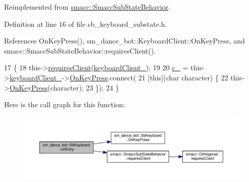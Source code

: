 Reimplemented from \hyperlink{classsmacc_1_1SmaccSubStateBehavior_a47eb8983afa8e1d312873a9a297b84f3}{smacc\+::\+Smacc\+Sub\+State\+Behavior}.



Definition at line 16 of file sb\+\_\+keyboard\+\_\+substate.\+h.



References On\+Key\+Press(), sm\+\_\+dance\+\_\+bot\+::\+Keyboard\+Client\+::\+On\+Key\+Press, and smacc\+::\+Smacc\+Sub\+State\+Behavior\+::requires\+Client().


\begin{DoxyCode}
17         \{
18                 this->\hyperlink{classsmacc_1_1SmaccSubStateBehavior_ae8361a9e794b02f9f3d962b881e4fd7d}{requiresClient}(\hyperlink{classsm__dance__bot_1_1SbKeyboard_a97e5f96ff468cf7a09b46027aba5ff3d}{keyboardClient\_});
19 
20                 \hyperlink{classsm__dance__bot_1_1SbKeyboard_a9dc9a84d7fdb70453fd98e9bb49e9e21}{c\_} = this->\hyperlink{classsm__dance__bot_1_1SbKeyboard_a97e5f96ff468cf7a09b46027aba5ff3d}{keyboardClient\_}->\hyperlink{classsm__dance__bot_1_1KeyboardClient_aeaf2f85801120bd76adfd6455650dc03}{OnKeyPress}.connect(
21                     [\textcolor{keyword}{this}](\textcolor{keywordtype}{char} character) \{
22                             this->\hyperlink{classsm__dance__bot_1_1SbKeyboard_a814aeec77233d8dd1124d4ed0f245f42}{OnKeyPress}(character);
23                     \});
24         \}
\end{DoxyCode}


Here is the call graph for this function\+:
\nopagebreak
\begin{figure}[H]
\begin{center}
\leavevmode
\includegraphics[width=350pt]{classsm__dance__bot_1_1SbKeyboard_a29e11be6710e9b62daab753be1419120_cgraph}
\end{center}
\end{figure}


